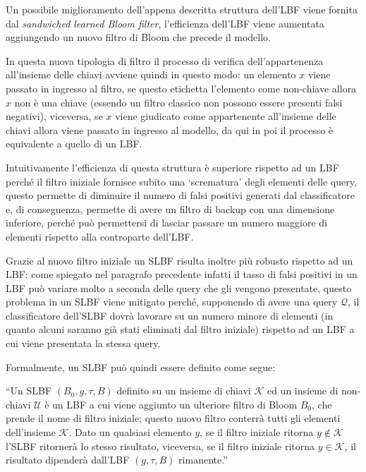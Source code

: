 \documentclass[../../main.tex]{subfiles}
\begin{document}
    Un possibile miglioramento dell'appena descritta struttura dell'LBF viene fornita dal \textit{sandwiched learned Bloom filter}, l'efficienza dell'LBF viene aumentata aggiungendo un nuovo filtro di Bloom che precede il modello.

    In questa nuova tipologia di filtro il processo di verifica dell'appartenenza all'insieme delle chiavi avviene quindi in questo modo: un elemento $x$ viene passato in ingresso al filtro, se questo etichetta l'elemento come non-chiave allora $x$ non è una chiave (essendo un filtro classico non possono essere presenti falsi negativi), viceversa, se $x$ viene giudicato come appartenente all'insieme delle chiavi allora viene passato in ingresso al modello, da qui in poi il processo è equivalente a quello di un LBF.

    Intuitivamente l'efficienza di questa struttura è superiore rispetto ad un LBF perché il filtro iniziale fornisce subito una `scrematura' degli elementi delle query, questo permette di diminuire il numero di falsi positivi generati dal classificatore e, di conseguenza, permette di avere un filtro di backup con una dimensione inferiore, perché può permettersi di lasciar passare un numero maggiore di elementi rispetto alla controparte dell'LBF.

    Grazie al nuovo filtro iniziale un SLBF risulta inoltre più robusto rispetto ad un LBF: come spiegato nel paragrafo precedente infatti il tasso di falsi positivi in un LBF può variare molto a seconda delle query che gli vengono presentate, questo problema in un SLBF viene mitigato perché, supponendo di avere una query $\mathcal{Q}$, il classificatore dell'SLBF dovrà lavorare su un numero minore di elementi (in quanto alcuni saranno già stati eliminati dal filtro iniziale) rispetto ad un LBF a cui viene presentata la stessa query.

    Formalmente, un SLBF può quindi essere definito come segue: 

    ``Un SLBF $(B_0, g, \tau, B)$ definito su un insieme di chiavi $\mathcal{K}$ ed un insieme di non-chiavi $\mathcal{U}$ è un LBF a cui viene aggiunto un ulteriore filtro di Bloom $B_0$, che prende il nome di filtro iniziale; questo nuovo filtro conterrà tutti gli elementi dell'insieme $\mathcal{K}$. Dato un qualsiasi elemento $y$, se il filtro iniziale ritorna $y \notin \mathcal{K}$ l'SLBF ritornerà lo stesso risultato, viceversa, se il filtro iniziale ritorna $y \in \mathcal{K}$, il risultato dipenderà dall'LBF $(g, \tau, B)$ rimanente.''
\end{document}
